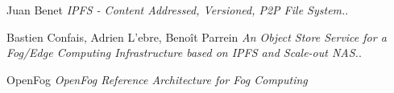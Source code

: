 \documentclass{article}
\begin{document}

\newpage

\begin{multicols}{2}
[]
    

    \begin{thebibliography}{1}

     Juan Benet {\em IPFS - Content Addressed, Versioned, P2P File System.}.

      Bastien Confais, Adrien L'ebre, Benoît Parrein {\em An Object Store Service for a Fog/Edge Computing
Infrastructure based on IPFS and Scale-out NAS.}.

     OpenFog {\em OpenFog Reference Architecture
for Fog Computing}

    \end{thebibliography}

\end{multicols}
\end{document}
